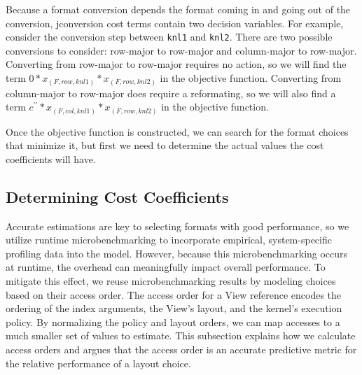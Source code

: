 \documentclass[sigconf,review=true]{acmart}
\begin{document}
Because a format conversion depends the format coming in and going out of the conversion, jconversion cost terms contain two decision variables.
For example, consider the conversion step between \verb.knl1. and \verb.knl2..
There are two possible conversions to consider: row-major to row-major and column-major to row-major. 
Converting from row-major to row-major requires no action, so we will find the term $0 * x_{(F,row,knl1)} * x_{(F,row,knl2)}$ in the objective function.
Converting from column-major to row-major does require a reformating, so we will also find a term $c^{\prime\prime} * x_{(F,col,knl1)} * x_{(F,row,knl2)}$ in the objective function.

Once the objective function is constructed, we can search for the format choices that minimize it, but first we need to determine the actual values the cost coefficients will have.

\subsection{Determining Cost Coefficients}

Accurate estimations are key to selecting formats with good performance, so we utilize runtime microbenchmarking to incorporate empirical, system-specific profiling data into the model.
However, because this microbenchmarking occurs at runtime, the overhead can meaningfully impact overall performance. 
To mitigate this effect, we reuse microbenchmarking results by modeling choices based on their access order.
The access order for a View reference encodes the ordering of the index arguments, the View's layout, and the kernel's execution policy.
By normalizing the policy and layout orders, we can map accesses to a much smaller set of values to estimate.
This subsection explains how we calculate access orders and argues that the access order is an accurate predictive metric for the relative performance of a layout choice. 
\end{document}
